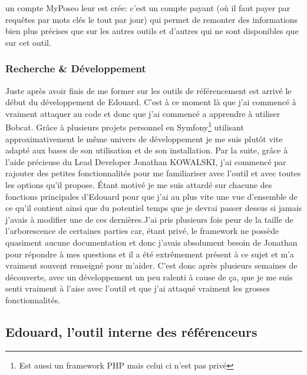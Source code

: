 \documentclass[12pt]{article}
\begin{document}
un compte MyPoseo leur est crée: c'est un compte payant (où il faut payer par requêtes par mots clés le tout par jour) qui permet de remonter des informations bien plus précises que sur les autres outils et d'autres qui ne sont disponibles que sur cet outil.

\newpage

\subsubsection{Recherche \& Développement}

Juste après avoir finis de me former sur les outils de référencement est arrivé le début du développement de Edouard. C'est à ce moment là que j'ai commencé à vraiment attaquer au code et donc que j'ai commencé a apprendre à utiliser Bobcat. Grâce à plusieurs projets personnel en Symfony\footnote{Est aussi un framework PHP mais celui ci n'est pas privé} utilisant approximativement le même univers de développement je me suis plutôt vite adapté aux bases de son utilisation et de son installation. Par la suite, grâce à l'aide précieuse du Lead Developer Jonathan KOWALSKI, j'ai commencé par rajouter des petites fonctionnalités pour me familiariser avec l'outil et avec toutes les options qu'il propose. Étant motivé je me suis attardé sur chacune des fonctions principales d'Edouard pour que j'ai au plus vite une vue d'ensemble de ce qu'il contient ainsi que du potentiel temps que je devrai passer dessus si jamais j'avais à modifier une de ces dernières.J'ai pris plusieurs fois peur de la taille de l'arborescence de certaines parties car, étant privé, le framework ne possède quasiment aucune documentation et donc j'avais absolument besoin de Jonathan pour répondre à mes questions et il a été extrêmement présent à ce sujet et m'a vraiment souvent renseigné pour m'aider. C'est donc après plusieurs semaines de découverte, avec un développement un peu ralenti à cause de ça, que je me suis senti vraiment à l'aise avec l'outil et que j'ai attaqué vraiment les grosses fonctionnalités.

\newpage
\subsection{Edouard, l'outil interne des référenceurs}
\end{document}

